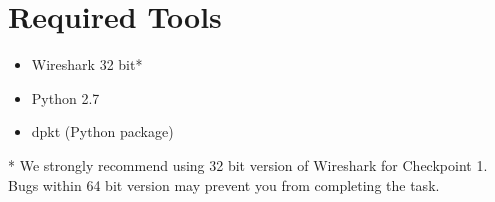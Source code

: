 \documentclass[letterpaper,12pt]{report}
\begin{document}
\section*{Required Tools}
\begin{itemize}
\item Wireshark 32 bit*
\item Python 2.7
\item dpkt (Python package)
\end{itemize}
* We strongly recommend using 32 bit version of Wireshark for Checkpoint 1.
Bugs within 64 bit version may prevent you from completing the task.

\newpage



\newpage

\setcounter{chapter}{4}



\newpage


\end{document}
